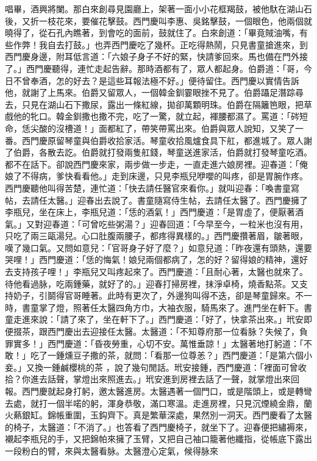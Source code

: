 唱畢，酒興將闌。那白來創尋見園廳上，架著一面小小花框羯鼓，被他馱在湖山石後，又折一枝花來，要催花擊鼓。西門慶叫李惠、吳銘擊鼓，一個眼色，他兩個就曉得了，從石孔內瞧著，到會吃的面前，鼓就住了。白來創道：「畢竟賊油嘴，有些作弊！我自去打鼓。」也弄西門慶吃了幾杯。正吃得熱鬧，只見書童搶進來，到西門慶身邊，附耳低言道：「六娘子身子不好的緊，快請爹回來。馬也備在門外接了。」西門慶聽得，連忙走起告辭。那時酒都有了，眾人都起身。伯爵道：「哥，今日不曾奉酒，怎的好去？是這些耳報法極不好。」便待留住。西門慶以實情告訴他，就謝了上馬來。伯爵又留眾人，一個韓金釧霎眼挫不見了。伯爵躡足潛踪尋去，只見在湖山石下撒尿，露出一條紅線，拋卻萬顆明珠。伯爵在隔籬笆眼，把草戲他的牝口。韓金釧撒也撒不完，吃了一驚，就立起，褌腰都濕了。罵道：「硶短命，恁尖酸的沒槽道！」面都紅了，帶笑帶罵出來。伯爵與眾人說知，又笑了一番。西門慶原留琴童與伯爵收拾家活。琴童收拾風爐食具下舡，都進城了。眾人謝了伯爵，各散去訖。伯爵就打發兩隻舡錢，琴童送進家活，伯爵就打發琴童吃酒。都不在話下。卻說西門慶來家，兩步做一步走，一直走進六娘房裡。迎春道：「俺娘了不得病，爹快看看他。」走到床邊，只見李瓶兒咿嚶的叫疼，卻是胃腕作疼。西門慶聽他叫得苦楚，連忙道：「快去請任醫官來看你。」就叫迎春：「喚書童寫帖，去請任太醫。」迎春出去說了。書童隨寫侍生帖，去請任太醫了。西門慶擁了李瓶兒，坐在床上，李瓶兒道：「恁的酒氣！」西門慶道：「是胃虛了，便厭著酒氣。」又對迎春道：「可曾吃些粥湯？」迎春回道：「今早至今，一粒米也沒有用，只吃了兩三甌湯兒。心口肚腹兩腰子，都疼得異樣的。」西門慶攢著眉，皺著眼，嘆了幾口氣。又問如意兒：「官哥身子好了麼？」如意兒道：「昨夜還有頭熱，還要哭哩！」西門慶道：「恁的悔氣！娘兒兩個都病了，怎的好？留得娘的精神，還好去支持孩子哩！」李瓶兒又叫疼起來了。西門慶道：「且耐心著，太醫也就來了。待他看過脉，吃兩鍾藥，就好了的。」迎春打掃房裡，抹淨卓椅，燒香點茶。又支持奶子，引鬬得官哥睡著。此時有更次了，外邊狗叫得不迭，卻是琴童歸來。不一時，書童掌了燈，照著任太醫四角方巾，大袖衣服，騎馬來了。進門坐在軒下。書童走進來說：「請了來了，坐在軒下了。」西門慶道：「好了，快拿茶出來。」玳安即便掇茶，跟西門慶出去迎接任太醫。太醫道：「不知尊府那一位看脉？失候了，負罪實多！」西門慶道：「昏夜勞重，心切不安。萬惟垂諒！」太醫著地打躬道：「不敢！」吃了一鍾燻豆子撒的茶，就問：「看那一位尊恙？」西門慶道：「是第六個小妾。」又換一鍾鹹櫻桃的茶 ，說了幾句閒話。玳安接鍾，西門慶道：「裡面可曾收拾？你進去話聲，掌燈出來照進去。」玳安進到房裡去話了一聲，就掌燈出來回報。西門慶就起身打躬，邀太醫進房。太醫遇著一個門口，或是階頭上，或是轉彎去處，就打一個半喏的躬，渾身恭敬，滿口寒溫。走進房裡，只見沉煙繞金鼎，蘭火爇銀缸。錦帳重圍，玉鈎齊下。真是繁華深處，果然別一洞天。西門慶看了太醫的椅子，太醫道：「不消了。」也答看了西門慶椅子，就坐下了。迎春便把繡褥來，襯起李瓶兒的手，又把錦帕來擁了玉臂，又把自己袖口籠著他纖指，從帳底下露出一段粉白的臂，來與太醫看脉。太醫澄心定氣，候得脉來 